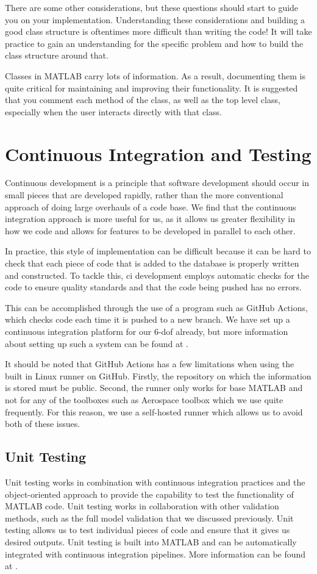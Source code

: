 \documentclass[10pt, openany, titlepage]{book}
\theoremstyle{definition}
\begin{document}
There are some other considerations, but these questions should start to guide you on your implementation. Understanding these considerations and building a good class structure is oftentimes more difficult than writing the code! It will take practice to gain an understanding for the specific problem and how to build the class structure around that.

Classes in MATLAB carry lots of information. As a result, documenting them is quite critical for maintaining and improving their functionality. It is suggested that you comment each method of the class, as well as the top level class, especially when the user interacts directly with that class.

\section{Continuous Integration and Testing}
Continuous development is a principle that software development should occur in small pieces that are developed rapidly, rather than the more conventional approach of doing large overhauls of a code base. We find that the continuous integration approach is more useful for us, as it allows us greater flexibility in how we code and allows for features to be developed in parallel to each other.

In practice, this style of implementation can be difficult because it can be hard to check that each piece of code that is added to the database is properly written and constructed. To tackle this, \gls{ci} development employs automatic checks for the code to ensure quality standards and that the code being pushed has no errors. 

This can be accomplished through the use of a program such as GitHub Actions, which checks code each time it is pushed to a new branch. We have set up a continuous integration platform for our 6-\gls{dof} already, but more information about setting up such a system can be found at \cite{mathworks_continuous_2025}.

It should be noted that GitHub Actions has a few limitations when using the built in Linux runner on GitHub. Firstly, the repository on which the information is stored must be public. Second, the runner only works for base MATLAB and not for any of the toolboxes such as Aerospace toolbox which we use quite frequently. For this reason, we use a self-hosted runner which allows us to avoid both of these issues.

\subsection{Unit Testing}
Unit testing works in combination with continuous integration practices and the object-oriented approach to provide the capability to test the functionality of MATLAB code. Unit testing works in collaboration with other validation methods, such as the full model validation that we discussed previously. Unit testing allows us to test individual pieces of code and ensure that it gives us desired outputs. Unit testing is built into MATLAB and can be automatically integrated with continuous integration pipelines. More information can be found at \cite{noauthor_unit_nodate, noauthor_ways_nodate}.
\end{document}

